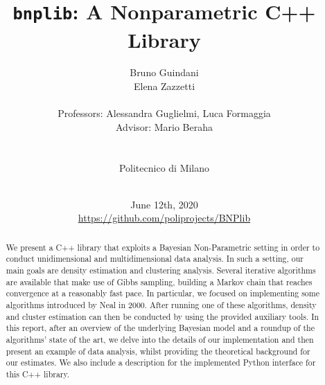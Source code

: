 \documentclass[a4paper]{report}
\title{\texttt{bnplib}: A Nonparametric C++ Library}
\author{
Bruno Guindani \\
Elena Zazzetti \\
\\
Professors: Alessandra Guglielmi, Luca Formaggia \\
Advisor: Mario Beraha \\
\\
\\
Politecnico di Milano \\
\\
}
\date{
June 12th, 2020
\\[250pt]
{\color{gray} {\url{https://github.com/poliprojects/BNPlib}}}
}
\begin{document}
\maketitle

\newpage\phantom{a}

\thispagestyle{empty}
\begin{abstract}
We present a C++ library that exploits a Bayesian Non-Parametric setting in order to conduct unidimensional and multidimensional data analysis.
In such a setting, our main goals are density estimation and clustering analysis.
Several iterative algorithms are available that make use of Gibbs sampling, building a Markov chain that reaches convergence at a reasonably fast pace.
In particular, we focused on implementing some algorithms introduced by Neal in 2000.
After running one of these algorithms, density and cluster estimation can then be conducted by using the provided auxiliary tools.
In this report, after an overview of the underlying Bayesian model and a roundup of the algorithms' state of the art, we delve into the details of our implementation and then present an example of data analysis, whilst providing the theoretical background for our estimates.
We also include a description for the implemented Python interface for this C++ library.
\end{abstract}
\setcounter{page}{4}

\tableofcontents















\end{document}
